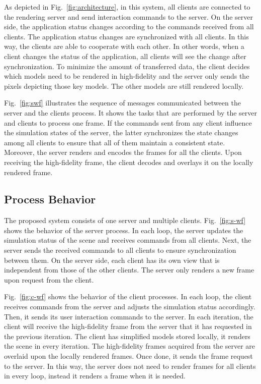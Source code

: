 As depicted in Fig.~\ref{fig:architecture}, in this system, all clients are connected to the rendering server and send interaction commands to the server.
On the server side, the application status changes according to the commands received from all clients. The application status changes are synchronized with all clients. In this way, the clients are able to cooperate with each other. In other words, when a client changes the status of the application, all clients will see the change after synchronization.
To minimize the amount of transferred data, the client decides which models need to be rendered in high-fidelity and the server only sends the pixels depicting those key models. The other models are still rendered locally.

Fig.~\ref{fig:swf} illustrates the sequence of messages communicated between the server and the clients process. It shows the tasks that are performed by the server and clients to process one frame. If the commands sent from any client influence the simulation states of the server, the latter synchronizes the state changes among all clients to ensure that all of them maintain a consistent state. Moreover, the server renders and encodes the frames for all the clients. Upon receiving the high-fidelity frame, the client decodes and overlays it on the locally rendered frame.

\subsection{Process Behavior}

The proposed system consists of one server and multiple clients.
Fig.~\ref{fig:s-wf} shows the behavior of the server process.
In each loop, the server updates the simulation status of the scene and receives commands from all clients.
Next, the server sends the received commands to all clients to ensure synchronization between them.
On the server side, each client has its own view that is independent from those of the other clients.
The server only renders a new frame upon request from the client.

Fig.~\ref{fig:c-wf} shows the behavior of the client processes. In each loop, the client receives commands from the server and adjusts the simulation status accordingly. Then, it sends its user interaction commands to the server. In each iteration, the client will receive the high-fidelity frame from the server that it has requested in the previous iteration. The client has simplified models stored locally, it renders the scene in every iteration. The high-fidelity frames acquired from the server are overlaid upon the locally rendered frames. Once done, it sends the frame request to the server. In this way, the server does not need to render frames for all clients in every loop, instead it renders a frame when it is needed.

